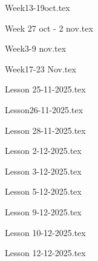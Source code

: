 \documentclass[a4paper, 12pt]{book} %
\begin{document}
    
    \thispagestyle{empty} %

    \tableofcontents %
    \clearpage

    
    {Week13-19oct.tex}

    {Week 27 oct - 2 nov.tex}

    {Week3-9 nov.tex}

    {Week17-23 Nov.tex}

    {Lesson 25-11-2025.tex}

    {Lesson26-11-2025.tex}

    {Lesson 28-11-2025.tex}

    {Lesson 2-12-2025.tex}

    {Lesson 3-12-2025.tex}

    {Lesson 5-12-2025.tex}

    {Lesson 9-12-2025.tex}

    {Lesson 10-12-2025.tex}

    {Lesson 12-12-2025.tex}
    
\end{document}
